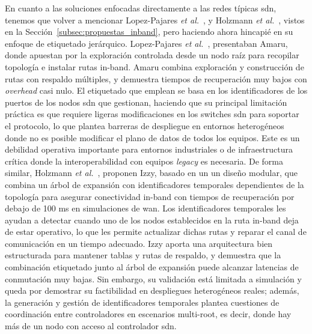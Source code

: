 En cuanto a las soluciones enfocadas directamente a las redes típicas \gls{sdn}, tenemos que volver a mencionar Lopez-Pajares \textit{et al.}~\cite{Lopez-Pajares19}, y Holzmann \textit{et al.}~\cite{Holzmann19}, vistos en la Sección~\ref{subsec:propuestas_inband}, pero haciendo ahora hincapié en su enfoque de etiquetado jerárquico. Lopez-Pajares \textit{et al.}~\cite{Lopez-Pajares19}, presentaban Amaru, donde apuestan por la exploración controlada desde un nodo raíz para recopilar topología e instalar rutas in-band. Amaru combina exploración y construcción de rutas con respaldo múltiples, y demuestra tiempos de recuperación muy bajos con \textit{overhead} casi nulo. El etiquetado que emplean se basa en los identificadores de los puertos de los nodos \gls{sdn} que gestionan, haciendo que su principal limitación práctica es que requiere ligeras modificaciones en los switches \gls{sdn} para soportar el protocolo, lo que plantea barreras de despliegue en entornos heterogéneos donde no es posible modificar el plano de datos de todos los equipos. Este es un debilidad operativa importante para entornos industriales o de infraestructura crítica donde la interoperabilidad con equipos \textit{legacy} es necesaria. De forma similar, Holzmann \textit{et al.}~\cite{Holzmann19}, proponen Izzy, basado en un un diseño modular, que combina un árbol de expansión con identificadores temporales dependientes de la topología para asegurar conectividad in-band con tiempos de recuperación por debajo de 100 ms en simulaciones de \gls{wan}. Los identificadores temporales les ayudan a detectar cuando uno de los nodos establecidos en la ruta in-band deja de estar operativo, lo que les permite actualizar dichas rutas y reparar el canal de comunicación en un tiempo adecuado. Izzy aporta una arquitectura bien estructurada para mantener tablas y rutas de respaldo, y demuestra que la combinación etiquetado junto al árbol de expansión puede alcanzar latencias de conmutación muy bajas. Sin embargo, su validación está limitada a simulación y queda por demostrar su factibilidad en despliegues heterogéneos reales; además, la generación y gestión de identificadores temporales plantea cuestiones de coordinación entre controladores en escenarios multi-root, es decir, donde hay más de un nodo con acceso al controlador \gls{sdn}.\\
\\
